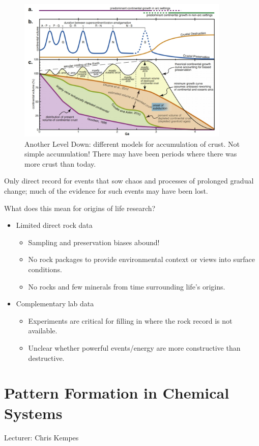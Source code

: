 \documentclass[]{article}
\begin{document}
\begin{figure}[H]
	\caption[Another Level Down: different models for accumulation of crust.]{Another Level Down: different models for accumulation of crust. Not simple accumulation! There may have been periods where there was more crust than today.}\label{fig:AnotherLevelDown} 
	\includegraphics[width=0.9\textwidth]{AnotherLevelDown}
\end{figure}

Only direct record for events that sow chaos and processes of prolonged gradual change; much of the evidence for such events may have been lost.

What does this mean for origins of life research?
\begin{itemize}
	\item Limited direct rock data
	\begin{itemize}
		\item 	Sampling and preservation
		biases abound!
			\item No rock packages to
		provide environmental
		context or views into surface
		conditions.
		\item 	No rocks and few minerals
		from time surrounding life’s
		origins.
	\end{itemize}
	\item Complementary lab data
	\begin{itemize}
		\item Experiments are critical for
		filling in where the rock
		record is not available.
			\item Unclear whether powerful
		events/energy are more
		constructive than destructive.
	\end{itemize}
\end{itemize}
\section{Pattern Formation in Chemical Systems}
Lecturer: Chris Kempes
\end{document}
